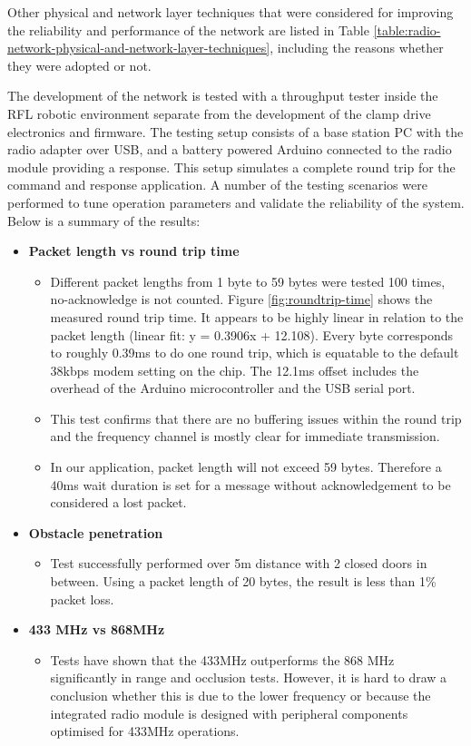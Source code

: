 Other physical and network layer techniques that were considered for improving the reliability and performance of the network are listed in Table \ref{table:radio-network-physical-and-network-layer-techniques}, including the reasons whether they were adopted or not.

The development of the network is tested with a throughput tester inside the RFL robotic environment separate from the development of the clamp drive electronics and firmware. The testing setup consists of a base station PC with the radio adapter over USB, and a battery powered Arduino connected to the radio module providing a response. This setup simulates a complete round trip for the command and response application. A number of the testing scenarios were performed to tune operation parameters and validate the reliability of the system. Below is a summary of the results:

\begin{itemize}
    \item \textbf{Packet length vs round trip time}
    \begin{itemize}
        \item Different packet lengths from 1 byte to 59 bytes were tested 100 times, no-acknowledge is not counted. Figure \ref{fig:roundtrip-time} shows the measured round trip time. It appears to be highly linear in relation to the packet length (linear fit: y = 0.3906x + 12.108). Every byte corresponds to roughly 0.39ms to do one round trip, which is equatable to the default 38kbps modem setting on the chip. The 12.1ms offset includes the overhead of the Arduino microcontroller and the USB serial port.
        \item This test confirms that there are no buffering issues within the round trip and the frequency channel is mostly clear for immediate transmission.
        \item In our application, packet length will not exceed 59 bytes. Therefore a 40ms wait duration is set for a message without acknowledgement to be considered a lost packet.
    \end{itemize}
    \item \textbf{Obstacle penetration}
    \begin{itemize}
        \item Test successfully performed over 5m distance with 2 closed doors in between. Using a packet length of 20 bytes, the result is less than 1\% packet loss.
    \end{itemize}
    \item \textbf{433 MHz vs 868MHz}
    \begin{itemize}
        \item Tests have shown that the 433MHz outperforms the 868 MHz significantly in range and occlusion tests. However, it is hard to draw a conclusion whether this is due to the lower frequency or because the integrated radio module is designed with peripheral components optimised for 433MHz operations.
    \end{itemize}
\end{itemize}

